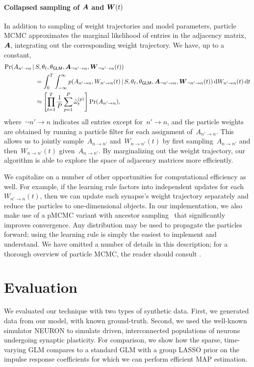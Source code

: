 \paragraph{Collapsed sampling of $\boldsymbol{A}$ and $\boldsymbol{W}(t)$}
In addition to sampling of weight trajectories and model parameters,
particle MCMC approximates the marginal likelihood of entries in the
adjacency matrix,~$\boldsymbol{A}$, integrating out the corresponding weight
trajectory. We have, up to a constant,
\begin{align*}
\Pr(A_{n'\to n} \,|\, &S, \theta_\ell, \theta_{\mathsf{GLM}}, \boldsymbol{A}_{\neg n' \to n}, \boldsymbol{W}_{\neg n' \to n}(t)) \\
&= \int_{0}^{T} \int_{-\infty}^{\infty} p( A_{n'\to n}, W_{n' \to n}(t) \,|\, S, \theta_\ell, \theta_{\mathsf{GLM}}, \boldsymbol{A}_{\neg n' \to n}, \boldsymbol{W}_{\neg n' \to n}(t))\, \mathrm{d}W_{n' \to n}(t)\, \mathrm{d}t\\
&\approx \left[\prod_{t=1}^T \frac{1}{P} \sum_{p=1}^P  \hat{\omega}^{(p)}_t \right] \Pr(A_{n'\to n}),
\end{align*}
where~${\neg n'\to n}$ indicates all entries except for~${n' \to n}$,
and the particle weights are obtained by running a particle filter for
each assignment of~$A_{n' \to n}$.  This allows us to jointly
sample~$A_{n \to n'}$ and~${W_{n \to n'}(t)}$ by first sampling~${A_{n
    \to n'}}$ and then~${W_{n \to n'}(t)}$ given~${A_{n \to n'}}$. By
marginalizing out the weight trajectory, our algorithm is able to
explore the space of adjacency matrices more efficiently.

We capitalize on a number of other opportunities for computational
efficiency as well. For example, if the learning rule factors into
independent updates for each~$W_{n' \to n}(t)$, then we can update
each synapse's weight trajectory separately and reduce the particles
to one-dimensional objects. In our implementation, we also make use of
a pMCMC variant with ancestor sampling~\cite{Lindsten-2012} that
significantly improves convergence. Any distribution may be used to
propagate the particles forward; using the learning rule is simply the
easiest to implement and understand.  We have omitted a number of
details in this description; for a thorough overview of particle MCMC,
the reader should consult \cite{Andrieu-2010, Lindsten-2012}.


\section{Evaluation}
We evaluated our technique with two types of synthetic data. First, we
generated data from our model, with known ground-truth. Second, we
used the well-known simulator NEURON to simulate driven,
interconnected populations of neurons undergoing synaptic
plasticity. For comparison, we show how the sparse, time-varying GLM
compares to a standard GLM with a group LASSO prior on the impulse
response coefficients for which we can perform efficient MAP
estimation.

